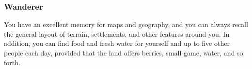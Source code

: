     \subsubsection{Wanderer}
        You have an excellent memory for maps and geography, and you can always recall the general layout of terrain, settlements, and other features around you.
        In addition, you can find food and fresh water for yourself and up to five other people each day, provided that the land offers berries, small game, water, and so forth.

